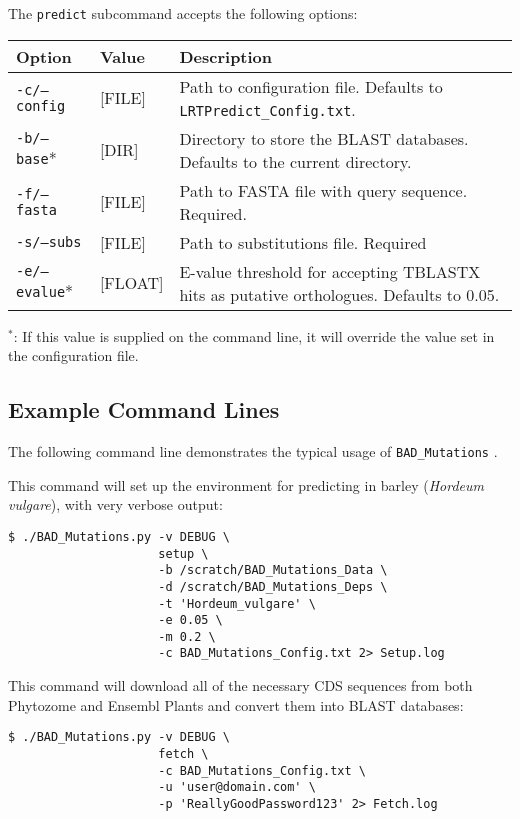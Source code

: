 \documentclass[12pt]{article}
\newcommand{\BM}{\texttt{BAD\_Mutations} }
\begin{document}
\par The \texttt{predict} subcommand accepts the following options:
\begin{table}[H]
    \centering
    \begin{tabular}{p{105pt} l p{260pt}}
    \toprule
    Option & Value & Description \\
    \midrule
    \texttt{-c/--config} & [FILE] & Path to configuration file. Defaults to \texttt{LRTPredict\_Config.txt}. \\
    \midrule
    \texttt{-b/--base}* & [DIR] & Directory to store the BLAST databases. Defaults to the current directory.\\
    \midrule
    \texttt{-f/--fasta} & [FILE] & Path to FASTA file with query sequence. Required.\\
    \midrule
    \texttt{-s/--subs} & [FILE] & Path to substitutions file. Required\\
    \midrule
    \texttt{-e/--evalue}* & [FLOAT] & E-value threshold for accepting TBLASTX hits as putative orthologues. Defaults to 0.05.\\
    \bottomrule
    \end{tabular}
\end{table}
\par $^*$: If this value is supplied on the command line, it will override
the value set in the configuration file.

\subsection*{Example Command Lines}
\par The following command line demonstrates the typical usage of \BM.

\par This command will set up the environment for predicting in barley
(\textit{Hordeum vulgare}), with very verbose output:
\begin{Verbatim}[frame=single, fontsize=\small, rulecolor=\color{gray}]
$ ./BAD_Mutations.py -v DEBUG \
                     setup \
                     -b /scratch/BAD_Mutations_Data \
                     -d /scratch/BAD_Mutations_Deps \
                     -t 'Hordeum_vulgare' \
                     -e 0.05 \
                     -m 0.2 \
                     -c BAD_Mutations_Config.txt 2> Setup.log
\end{Verbatim}

\par This command will download all of the necessary CDS sequences from both
Phytozome and Ensembl Plants and convert them into BLAST databases:
\begin{Verbatim}[frame=single, fontsize=\small, rulecolor=\color{gray}]
$ ./BAD_Mutations.py -v DEBUG \
                     fetch \
                     -c BAD_Mutations_Config.txt \
                     -u 'user@domain.com' \
                     -p 'ReallyGoodPassword123' 2> Fetch.log
\end{Verbatim}
\end{document}
